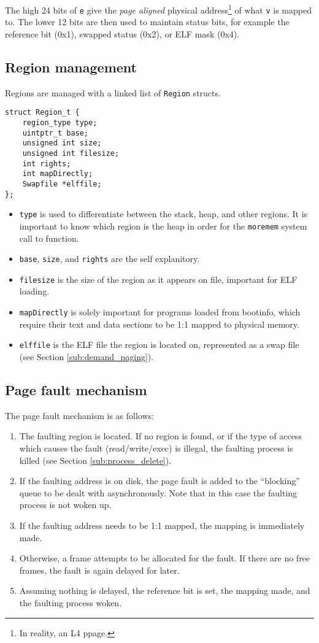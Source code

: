 \documentclass[12pt,english]{article}
\begin{document}
The high 24 bits of \texttt{e} give the \emph{page aligned} physical address\footnote{In reality, an L4 ppage.} of what \texttt{v} is mapped to.  The lower 12 bits are then used to maintain status bits, for example the reference bit (0x1), swapped status (0x2), or ELF mask (0x4).

\subsection{Region management}

Regions are managed with a linked list of \texttt{Region} structs.

\begin{verbatim}
struct Region_t {
    region_type type;
    uintptr_t base;
    unsigned int size;
    unsigned int filesize;
    int rights;
    int mapDirectly;
    Swapfile *elffile;
};
\end{verbatim}

\begin{itemize}
\item \texttt{type} is used to differentiate between the stack, heap, and other regions.  It is important to know which region is the heap in order for the \texttt{moremem} system call to function.
\item \texttt{base}, \texttt{size}, and \texttt{rights} are the self explanitory.
\item \texttt{filesize} is the size of the region as it appears on file, important for ELF loading.
\item \texttt{mapDirectly} is solely important for programs loaded from bootinfo, which require their text and data sections to be 1:1 mapped to physical memory.
\item \texttt{elffile} is the ELF file the region is located on, represented as a swap file (see Section \ref{sub:demand_paging}).
\end{itemize}

\subsection{Page fault mechanism}

The page fault mechanism is as follows:
\begin{enumerate}
\item The faulting region is located.  If no region is found, or if the type of access which causes the fault (read/write/exec) is illegal, the faulting process is killed (see Section \ref{sub:process_delete}).
\item If the faulting address is on disk, the page fault is added to the ``blocking'' queue to be dealt with asynchronously.  Note that in this case the faulting process is not woken up.
\item If the faulting address needs to be 1:1 mapped, the mapping is immediately made.
\item Otherwise, a frame attempts to be allocated for the fault.  If there are no free frames, the fault is again delayed for later.
\item Assuming nothing is delayed, the reference bit is set, the mapping made, and the faulting process woken.
\end{enumerate}
\end{document}
